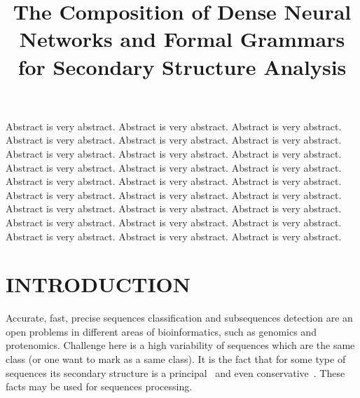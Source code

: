 \documentclass[a4paper,twoside]{article}
\begin{document}
\title{The Composition of Dense Neural Networks and Formal Grammars for Secondary Structure Analysis}

\author{
}


\abstract
{
Abstract is very abstract. Abstract is very abstract. Abstract is very abstract.
Abstract is very abstract. Abstract is very abstract. Abstract is very abstract.
Abstract is very abstract. Abstract is very abstract. Abstract is very abstract.
Abstract is very abstract. Abstract is very abstract. Abstract is very abstract.
Abstract is very abstract. Abstract is very abstract. Abstract is very abstract.
Abstract is very abstract. Abstract is very abstract. Abstract is very abstract.
Abstract is very abstract. Abstract is very abstract. Abstract is very abstract.
Abstract is very abstract. Abstract is very abstract. Abstract is very abstract.
Abstract is very abstract. Abstract is very abstract. Abstract is very abstract.
}

\onecolumn \maketitle \normalsize \vfill

\section{\uppercase{Introduction}}
\label{sec:introduction}

\noindent Accurate, fast, precise sequences classification and subsequences detection are an open problems in different areas of bioinformatics, such as genomics and protenomics. 
Challenge here is a high variability of sequences which are the same class (or one want to mark as a same class).
It is the fact that for some type of sequences its secondary structure is a principal~\cite{!!!} and even conservative~\cite{!!!}. 
These facts may be used for sequences processing.
\end{document}
